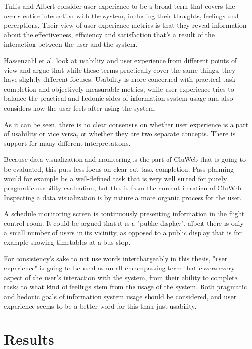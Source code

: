 \cite{bevan2009difference, bevaniso, bevanevaluation, bevanstandard}

Tullis and Albert consider user experience to be a broad term that covers the user's entire interaction with the system, including their thoughts, feelings and perceptions. Their view of user experience metrics is that they reveal information about the effectiveness, efficiency and satisfaction that's a result of the interaction between the user and the system. \cite{albert2013measuring}

Hassenzahl et al. look at usability and user experience from different points of view and argue that while these terms practically cover the same things, they have slightly different focuses. Usability is more concerned with practical task completion and objectively measurable metrics, while user experience tries to balance the practical and hedonic sides of information system usage and also considers how the user feels after using the system.
\cite{hassenzahl2006user}

As it can be seen, there is no clear consensus on whether user experience is a part of usability or vice versa, or whether they are two separate concepts. There is support for many different interpretations. 

Because data visualization and monitoring is the part of CluWeb that is going to be evaluated, this puts less focus on clear-cut task completion. Pass planning would for example be a well-defined task that is very well suited for purely pragmatic usability evaluation, but this is from the current iteration of CluWeb. Inspecting a data visualization is by nature a more organic process for the user.

A schedule monitoring screen is continuously presenting information in the flight control room. It could be argued that it is a "public display", albeit there is only a small number of users in its vicinity, as opposed to a public display that is for example showing timetables at a bus stop.

For consistency's sake to not use words interchargeably in this thesis, "user experience" is going to be used as an all-encompassing term that covers every aspect of the user's interaction with the system, from their ability to complete tasks to what kind of feelings stem from the usage of the system. Both pragmatic and hedonic goals of information system usage should be considered, and user experience seems to be a better word for this than just usability. 

\cite{nielsen1995usability, hollingsed2007usability, holzinger2005usability, rubin2008handbook, dumas1999practical, vermeeren2010user, bevan2009difference, vaananen2008towards, laugwitz2008construction, obrist2009user, battleson2001usability, van2003retrospective, hassenzahl2010needs, albert2013measuring}

\section{Results}